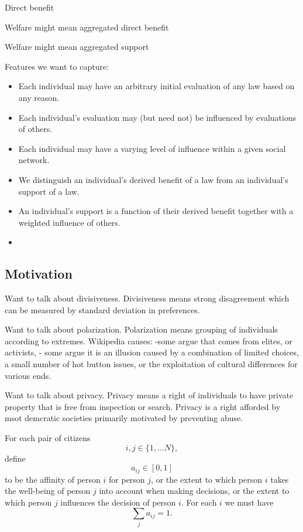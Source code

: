 Direct benefit

Welfare might mean aggregated direct benefit

Welfare might mean aggregated support


Features we want to capture:

\begin{itemize}
\item Each individual may have an arbitrary initial evaluation of any law based on any reason.
\item Each individual's evaluation may (but need not) be influenced by evaluations of others.
\item Each individual may have a varying level of influence within a given social network.
\item We distinguish an individual's derived benefit of a law from an individual's support of a law. 
\item An individual's support is a function of their derived benefit together with a weighted influence of others. %
\item 
\end{itemize}

\subsection{Motivation}
Want to talk about divisiveness.
Divisiveness means strong disagreement which can be measured by standard deviation in preferences.

Want to talk about polarization.
Polarization means grouping of individuals according to extremes.
Wikipedia causes: 
-some argue that comes from elites, or activists,
- some argue it is an illusion caused by a combination of limited choices, a small number of hot button issues, or the exploitation of cultural differences for various ends.

Want to talk about privacy.
Privacy means a right of individuals to have private property that is free from inspection or search. Privacy is a right afforded by msot demcratic societies primarily motivated by preventing abuse.

For each pair of citizens $$i,j\in\{1,\dots N\},$$ define $$a_{ij}\in [0,1]$$ to be the affinity of person $i$ for person $j$, or the extent to which person $i$ takes the well-being of person $j$ into account when making decisions, or the extent to which person $j$ influences the decision of person $i$. For each $i$ we must have $$\sum_ja_{ij}=1.$$%

